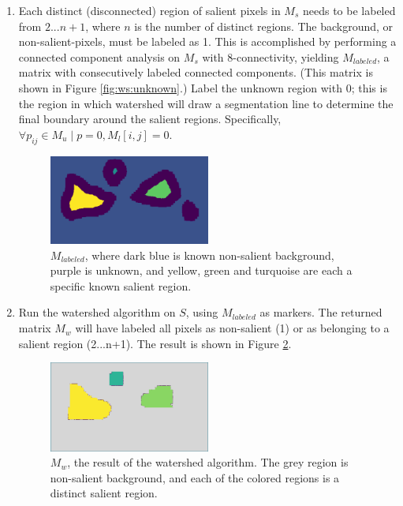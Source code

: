 \begin{enumerate}
\item
Each distinct (disconnected) region of salient pixels in $M_s$ needs to be labeled from $2...n+1$, where $n$ is the number of distinct regions. The background, or non-salient-pixels, must be labeled as 1. This is accomplished by performing a connected component analysis on $M_s$ with 8-connectivity, yielding $M_{labeled}$, a matrix with consecutively labeled connected components. (This matrix is shown in Figure \ref{fig:ws:unknown}.)
Label the unknown region with 0; this is the region in which watershed will draw a segmentation line to determine the final boundary around the salient regions. Specifically, $\forall p_{ij} \in M_u \mid p=0, M_l[i, j] = 0$.

\begin{figure}[htbp]
  \centering
  \includegraphics[width=0.5\textwidth]{ws_images/ws_labeled.png}
  \caption{$M_{labeled}$, where dark blue is known non-salient background, purple is unknown, and yellow, green and turquoise are each a specific known salient region.}
  \label{fig:ws:labeled}
\end{figure}

\item
Run the watershed algorithm on $S$, using $M_{labeled}$ as markers. The returned matrix $M_w$ will have labeled all pixels as non-salient (1) or as belonging to a salient region (2...n+1). The result is shown in Figure \ref{fig:ws:ws}.

\begin{figure}[htbp]
  \centering
  \includegraphics[width=0.5\textwidth]{ws_images/ws_ws.png}
  \caption{$M_{w}$, the result of the watershed algorithm. The grey region is non-salient background, and each of the colored regions is a distinct salient region.}
  \label{fig:ws:ws}
\end{figure}


\end{enumerate}
